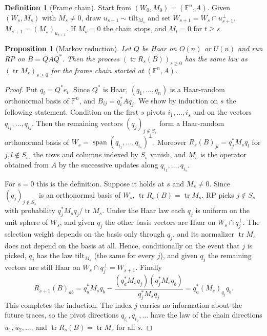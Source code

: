 \documentclass[11pt,a4paper]{article}
\newtheorem{proposition}[theorem]{Proposition}
\theoremstyle{definition}
\newtheorem{definition}[theorem]{Definition}
\newcommand{\F}{\mathbb{F}}
\newcommand{\tr}{\operatorname{tr}}
\newcommand{\tilt}{\mathrm{tilt}}
\begin{document}
\begin{definition}[Frame chain]\label{def:framechain}
Start from $(W_0,M_0)=(\F^n,A)$. Given $(W_s,M_s)$ with $M_s\ne0$, draw $u_{s+1}\sim\tilt_{M_s}$ and set $W_{s+1}=W_s\cap u_{s+1}^\perp$, $M_{s+1}=(M_s)_{u_{s+1}}$. If $M_s=0$ the chain stops, and $M_t=0$ for $t\ge s$.
\end{definition}

\begin{proposition}[Markov reduction]\label{prop:markov}
Let $Q$ be Haar on $O(n)$ or $U(n)$ and run RP on $B=QAQ^*$. Then the process $(\tr R_s(B))_{s\ge0}$ has the same law as $(\tr M_s)_{s\ge0}$ for the frame chain started at $(\F^n,A)$.
\end{proposition}

\begin{proof}
Put $q_i=Q^*e_i$. Since $Q^*$ is Haar, $(q_1,\dots,q_n)$ is a Haar-random orthonormal basis of $\F^n$, and $B_{ij}=q_i^*Aq_j$. We show by induction on $s$ the following statement. Condition on the first $s$ pivots $i_1,\dots,i_s$ and on the vectors $q_{i_1},\dots,q_{i_s}$. Then the remaining vectors $(q_j)_{j\notin S_s}$ form a Haar-random orthonormal basis of $W_s=\operatorname{span}(q_{i_1},\dots,q_{i_s})^\perp$. Moreover $R_s(B)_{jl}=q_j^*M_sq_l$ for $j,l\notin S_s$, the rows and columns indexed by $S_s$ vanish, and $M_s$ is the operator obtained from $A$ by the successive updates along $q_{i_1},\dots,q_{i_s}$.

For $s=0$ this is the definition. Suppose it holds at $s$ and $M_s\ne0$. Since $(q_j)_{j\notin S_s}$ is an orthonormal basis of $W_s$, $\tr R_s(B)=\tr M_s$. RP picks $j\notin S_s$ with probability $q_j^*M_sq_j/\tr M_s$. Under the Haar law each $q_j$ is uniform on the unit sphere of $W_s$, and given $q_j$ the other basis vectors are Haar on $W_s\cap q_j^\perp$. The selection weight depends on the basis only through $q_j$, and its normalizer $\tr M_s$ does not depend on the basis at all. Hence, conditionally on the event that $j$ is picked, $q_j$ has the law $\tilt_{M_s}$ (the same for every $j$), and given $q_j$ the remaining vectors are still Haar on $W_s\cap q_j^\perp=W_{s+1}$. Finally
\[
R_{s+1}(B)_{ab}=q_a^*M_sq_b-\frac{(q_a^*M_sq_j)(q_j^*M_sq_b)}{q_j^*M_sq_j}=q_a^*(M_s)_{q_j}q_b .
\]
This completes the induction. The index $j$ carries no information about the future traces, so the pivot directions $q_{i_1},q_{i_2},\dots$ have the law of the chain directions $u_1,u_2,\dots$, and $\tr R_s(B)=\tr M_s$ for all $s$.
\end{proof}
\end{document}
